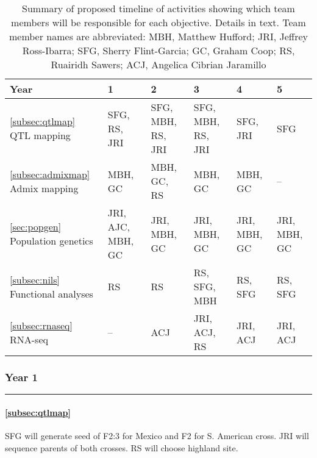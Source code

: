 \begin{table}[t!]
\label{tab:timeline}
\begin{center}
\caption{Summary of proposed timeline of activities showing which team members will be responsible for each objective. Details in text. Team member names are abbreviated: MBH, Matthew Hufford; JRI, Jeffrey Ross-Ibarra; SFG, Sherry Flint-Garcia; GC, Graham Coop; RS, Ruairidh Sawers; ACJ, Angelica Cibrian Jaramillo}\label{tab:timeline}
\begin{tabular}{p{3.5cm}p{2cm}p{2cm}p{2cm}p{2cm}p{2cm}}\\\toprule  
{\bf Year} & {\bf 1} & {\bf 2} & {\bf 3} & {\bf 4} & {\bf 5} \\\midrule
\ref{subsec:qtlmap} \hspace{3cm} QTL mapping 			& SFG, RS, JRI 	& SFG, MBH, RS, JRI 	& SFG, MBH, RS, JRI 	& SFG, JRI			& SFG \\\midrule
\ref{subsec:admixmap} \hspace{3cm} Admix mapping		& MBH, GC 				& MBH, GC, RS 		& MBH, GC 			& MBH, GC			& -- \\\midrule
\ref{sec:popgen} \hspace{3cm} Population genetics		& JRI, AJC, MBH, GC 		& JRI, MBH, GC  	& JRI, MBH, GC		& JRI, MBH, GC 	& JRI, MBH, GC \\\midrule
\ref{subsec:nils} \hspace{2cm} Functional \mbox{analyses} 		& RS 				& RS		& RS, SFG, MBH 			& RS, SFG 	& RS, SFG  \\\midrule
\ref{subsec:rnaseq} \hspace{2cm} RNA-seq 				& --  					& ACJ 				& JRI, ACJ, RS  			& JRI, ACJ	& JRI, ACJ \\\bottomrule
\end{tabular}
\end{center}
\end{table} 

\subsubsection*{Year 1} \hrule \vspace{0.1cm}

\paragraph{  \bf \ref{subsec:qtlmap}} SFG will generate seed of F2:3 for Mexico and F2 for S. American cross.  JRI will sequence parents of both crosses. RS will choose highland site.
